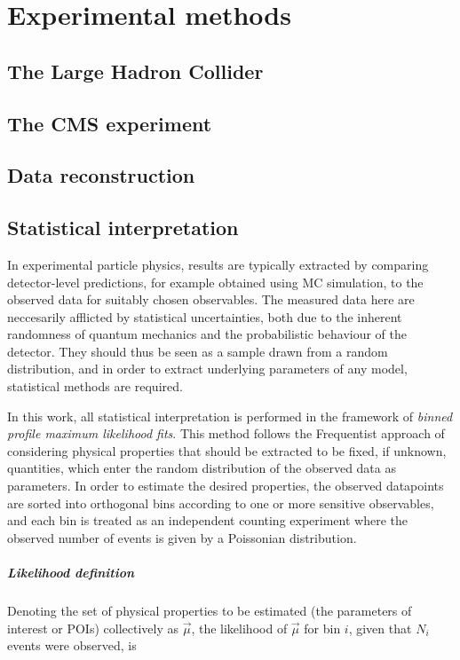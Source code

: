 \chapter{Experimental methods}
\label{ch:methods}

\section{The Large Hadron Collider}

\section{The CMS experiment}

\section{Data reconstruction}
\label{sec:methods:reco}

\section{Statistical interpretation}
\label{sec:methods:stat}

In experimental particle physics, results are typically extracted by comparing detector-level predictions, for example obtained using MC simulation, to the observed data for suitably chosen observables. The measured data here are neccesarily afflicted by statistical uncertainties, both due to the inherent randomness of quantum mechanics and the probabilistic behaviour of the detector. They should thus be seen as a sample drawn from a random distribution, and in order to extract underlying parameters of any model, statistical methods are required.

In this work, all statistical interpretation is performed in the framework of \textit{binned profile maximum likelihood fits}. This method follows the Frequentist approach of considering physical properties that should be extracted to be fixed, if unknown, quantities, which enter the random distribution of the observed data as parameters. In order to estimate the desired properties, the observed datapoints are sorted into orthogonal bins according to one or more sensitive observables, and each bin is treated as an independent counting experiment where the observed number of events is given by a Poissonian distribution. 

\paragraph{Likelihood definition}
Denoting the set of physical properties to be estimated (the parameters of interest or POIs) collectively as $\vec{\mu}$, the likelihood of $\vec{\mu}$ for bin $i$, given that $N_i$ events were observed, is

